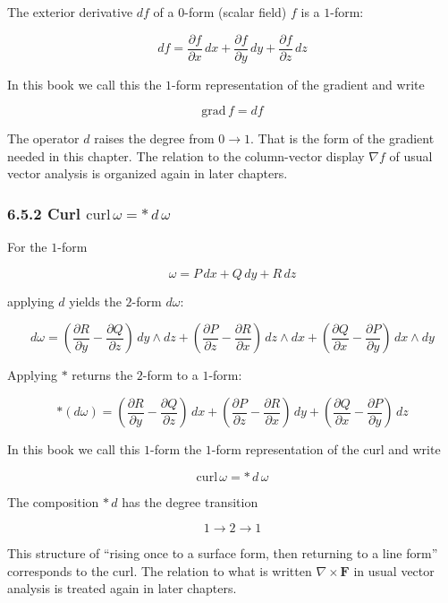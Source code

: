 The exterior derivative \(df\) of a \(0\)-form (scalar field) \(f\) is a
\(1\)-form:

\[
df = \frac{\partial f}{\partial x}\,dx
{}+ \frac{\partial f}{\partial y}\,dy
{}+ \frac{\partial f}{\partial z}\,dz
\]

In this book we call this the \(1\)-form representation of the gradient
and write

\[
\mathrm{grad}\,f = df
\]

The operator \(d\) raises the degree from \(0 \to 1\). That is the form
of the gradient needed in this chapter. The relation to the
column-vector display \(\nabla f\) of usual vector analysis is organized
again in later chapters.

\hypertarget{curl-mathrmcurlomega-astdomega}{%
\subsubsection{\texorpdfstring{6.5.2 Curl
\(\mathrm{curl}\,\omega = \ast\,d\,\omega\)}{6.5.2 Curl \textbackslash mathrm\{curl\}\textbackslash,\textbackslash omega = \textbackslash ast\textbackslash,d\textbackslash,\textbackslash omega}}\label{curl-mathrmcurlomega-astdomega}}

For the \(1\)-form

\[
\omega = P\,dx + Q\,dy + R\,dz
\]

applying \(d\) yields the \(2\)-form \(d\omega\):

\[d\omega = (\frac{\partial R}{\partial y} - \frac{\partial Q}{\partial z})\,dy \wedge dz + (\frac{\partial P}{\partial z} - \frac{\partial R}{\partial x})\,dz \wedge dx + (\frac{\partial Q}{\partial x} - \frac{\partial P}{\partial y})\,dx \wedge dy\]

Applying \(\ast\) returns the \(2\)-form to a \(1\)-form:

\[\ast(d\omega) = (\frac{\partial R}{\partial y} - \frac{\partial Q}{\partial z})\,dx + (\frac{\partial P}{\partial z} - \frac{\partial R}{\partial x})\,dy + (\frac{\partial Q}{\partial x} - \frac{\partial P}{\partial y})\,dz\]

In this book we call this \(1\)-form the \(1\)-form representation of
the curl and write

\[\mathrm{curl}\,\omega = \ast\,d\,\omega\]

The composition \(\ast\,d\) has the degree transition

\[
1 \to 2 \to 1
\]

This structure of ``rising once to a surface form, then returning to a
line form'' corresponds to the curl. The relation to what is written
\(\nabla\times\mathbf F\) in usual vector analysis is treated again in
later chapters.

